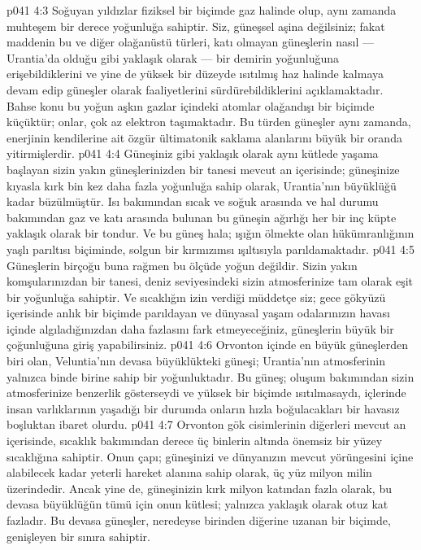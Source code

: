 \vs p041 4:3 Soğuyan yıldızlar fiziksel bir biçimde gaz halinde olup, aynı zamanda muhteşem bir derece yoğunluğa sahiptir. Siz, güneşsel aşina değilsiniz; fakat maddenin bu ve diğer olağanüstü türleri, katı olmayan güneşlerin nasıl --- Urantia’da olduğu gibi yaklaşık olarak --- bir demirin yoğunluğuna erişebildiklerini ve yine de yüksek bir düzeyde ısıtılmış haz halinde kalmaya devam edip güneşler olarak faaliyetlerini sürdürebildiklerini açıklamaktadır. Bahse konu bu yoğun aşkın gazlar içindeki atomlar olağandışı bir biçimde küçüktür; onlar, çok az elektron taşımaktadır. Bu türden güneşler aynı zamanda, enerjinin kendilerine ait özgür ültimatonik saklama alanlarını büyük bir oranda yitirmişlerdir.
\vs p041 4:4 Güneşiniz gibi yaklaşık olarak aynı kütlede yaşama başlayan sizin yakın güneşlerinizden bir tanesi mevcut an içerisinde; güneşinize kıyasla kırk bin kez daha fazla yoğunluğa sahip olarak, Urantia’nın büyüklüğü kadar büzülmüştür. Isı bakımından sıcak ve soğuk arasında ve hal durumu bakımından gaz ve katı arasında bulunan bu güneşin ağırlığı her bir inç küpte yaklaşık olarak bir tondur. Ve bu güneş hala; ışığın ölmekte olan hükümranlığının yaşlı parıltısı biçiminde, solgun bir kırmızımsı ışıltısıyla parıldamaktadır.
\vs p041 4:5 Güneşlerin birçoğu buna rağmen bu ölçüde yoğun değildir. Sizin yakın komşularınızdan bir tanesi, deniz seviyesindeki sizin atmosferinize tam olarak eşit bir yoğunluğa sahiptir. Ve sıcaklığın izin verdiği müddetçe siz; gece gökyüzü içerisinde anlık bir biçimde parıldayan ve dünyasal yaşam odalarınızın havası içinde algıladığınızdan daha fazlasını fark etmeyeceğiniz, güneşlerin büyük bir çoğunluğuna giriş yapabilirsiniz.
\vs p041 4:6 Orvonton içinde en büyük güneşlerden biri olan, Veluntia’nın devasa büyüklükteki güneşi; Urantia’nın atmosferinin yalnızca binde birine sahip bir yoğunluktadır. Bu güneş; oluşum bakımından sizin atmosferinize benzerlik gösterseydi ve yüksek bir biçimde ısıtılmasaydı, içlerinde insan varlıklarının yaşadığı bir durumda onların hızla boğulacakları bir havasız boşluktan ibaret olurdu.
\vs p041 4:7 Orvonton gök cisimlerinin diğerleri mevcut an içerisinde, sıcaklık bakımından derece üç binlerin altında önemsiz bir yüzey sıcaklığına sahiptir. Onun çapı; güneşinizi ve dünyanızın mevcut yörüngesini içine alabilecek kadar yeterli hareket alanına sahip olarak, üç yüz milyon milin üzerindedir. Ancak yine de, güneşinizin kırk milyon katından fazla olarak, bu devasa büyüklüğün tümü için onun kütlesi; yalnızca yaklaşık olarak otuz kat fazladır. Bu devasa güneşler, neredeyse birinden diğerine uzanan bir biçimde, genişleyen bir sınıra sahiptir.
